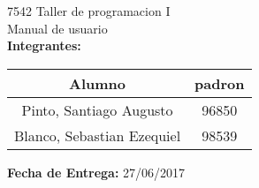 \begin{titlepage}
    \vspace*{\fill}
    \begin{center}
        \Large 7542 Taller de programacion I \\
        \Huge Manual de usuario\\
        \bigskip\bigskip\bigskip
        \large\textbf{Integrantes:} \\
        \begin{center}
            \begin{tabular}{||c | c||}
                \hline
                Alumno & padron \\ [0.5ex]
                \hline\hline
                Pinto, Santiago Augusto & 96850 \\
                \hline
                Blanco, Sebastian Ezequiel & 98539 \\
                \hline
            \end{tabular}
        \end{center}
        \textbf{Fecha de Entrega:} 27/06/2017\\

    \end{center}
    \vspace*{\fill}
\end{titlepage}
